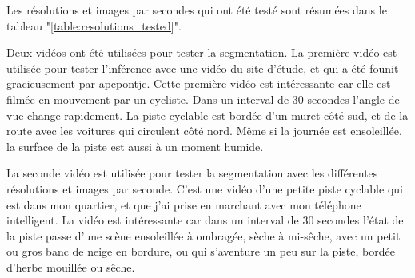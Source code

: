 \par Les résolutions et images par secondes qui ont été testé sont résumées dans le tableau "\ref{table:resolutions_tested}". 
\par Deux vidéos ont été utilisées pour tester la segmentation. La première vidéo est utilisée pour tester l'inférence avec une vidéo du site d'étude, et qui a été founit gracieusement par \acrlong{apcpontjc}. Cette première vidéo est intéressante car elle est filmée en mouvement par un cycliste. Dans un interval de 30 secondes l'angle de vue change rapidement. La piste cyclable est bordée d'un muret côté sud, et de la route avec les voitures qui circulent côté nord. Même si la journée est ensoleillée, la surface de la piste est aussi à un moment humide.
\par La seconde vidéo est utilisée pour tester la segmentation avec les différentes résolutions et images par seconde. C'est une vidéo d'une petite piste cyclable qui est dans mon quartier, et que j'ai prise en marchant avec mon téléphone intelligent. La vidéo est intéressante car dans un interval de 30 secondes l'état de la piste passe d'une scène ensoleillée à ombragée, sèche à mi-sêche, avec un petit ou gros banc de neige en bordure, ou qui s'aventure un peu sur la piste, bordée d'herbe mouillée ou sêche.